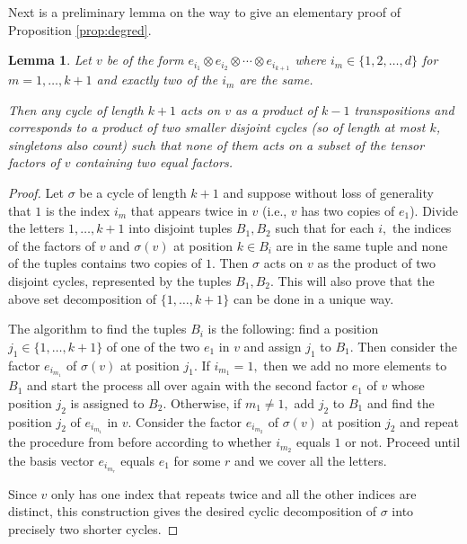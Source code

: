 \documentclass[12pt,dvipsnames,accepted=2016-08-18,a4paper,onecolumn]{quantumarticle}
\numberwithin{equation}{section}
\newtheorem{lemma}[theorem]{Lemma}
\theoremstyle{definition}
\begin{document}
Next is a preliminary lemma on the way to give an elementary proof of Proposition \ref{prop:degred}.

\begin{lemma}\label{lemma 1.1} Let $v$ be of the form $e_{i_1} \otimes e_{i_2} \otimes \cdots \otimes e_{i_{k+1}}$ where $i_m \in \{1,2,\ldots, d\}$ for $m=1, \ldots, k+1$ and exactly two of the $i_m$ are the same. 
	
	Then any cycle of length $k+1$ acts on $v$ as a product of $k-1$ transpositions and corresponds to a product of two smaller disjoint cycles (so of length at most $k$, singletons also count)  such that none of them acts on a subset of the tensor factors of $v$ containing two equal factors.
\end{lemma}

\begin{proof}
 Let $\sigma$ be a cycle of length $k+1$ and suppose without loss of generality that $1$ is the index $i_m$ that appears twice in $v$ (i.e., $v$ has two copies of $e_1$). Divide the letters $1,\ldots,k+1$ into disjoint tuples $B_1, B_2$ such that for each $i,$ the indices of the factors of $v$ and $\sigma(v)$ at position $k \in B_i$ are in the same tuple and none of the tuples contains two copies of $1.$ Then $\sigma$  acts on $v$ as the product of two disjoint cycles, represented by the tuples $B_1,B_2.$ This will also prove that the above set decomposition of $\{1,\ldots,k+1\}$ can be done in a unique way. 
	
	The algorithm to find the tuples $B_i$ is the following: find a position $j_1 \in \{1,\ldots,k+1\}$ of one of the two $e_1$ in $v$ and assign $j_1$ to $B_1.$ Then consider the factor $e_{i_{m_1}}$ of $\sigma(v)$ at position $j_1.$ If $i_{m_1} = 1,$ then we add no more elements to $B_1$ and start the process all over again with the second factor $e_1$ of $v$ whose position $j_2$ is assigned to $B_2.$ Otherwise, if $m_1 \neq 1,$ add $j_2$ to $B_1$ and find the position $j_2$ of $e_{i_{m_1}}$ in $v.$  Consider the factor $e_{i_{m_2}}$ of $\sigma(v)$ at position $j_2$ and repeat the procedure from before according to whether $i_{m_2}$ equals $1$ or not. Proceed until the basis vector $e_{i_{m_r}}$ equals $e_1$ for some $r$ and we cover all the letters.
	
	Since $v$ only has one index that repeats twice and all the other indices are distinct, this construction gives the desired cyclic decomposition of $\sigma$ into precisely two shorter cycles.
\end{proof}
\end{document}
